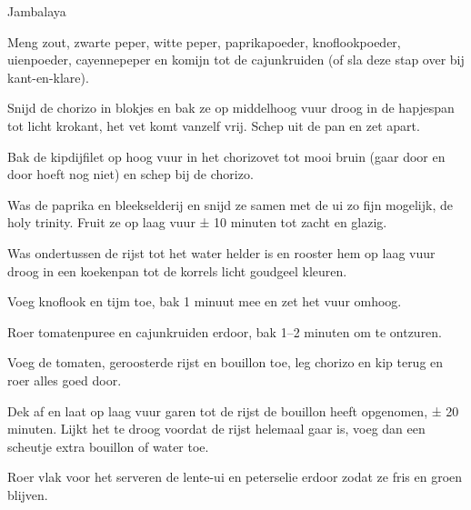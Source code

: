 \begin{recipe}{Jambalaya}
\begin{steps}
  \item Meng zout, zwarte peper, witte peper, paprikapoeder, knoflookpoeder,
        uienpoeder, cayennepeper en komijn tot de cajunkruiden (of sla deze
        stap over bij kant-en-klare).
  \item Snijd de chorizo in blokjes en bak ze op middelhoog vuur droog in de
        hapjespan tot licht krokant, het vet komt vanzelf vrij. Schep uit de
        pan en zet apart.
  \item Bak de kipdijfilet op hoog vuur in het chorizovet tot mooi bruin
        (gaar door en door hoeft nog niet) en schep bij de chorizo.
  \item Was de paprika en bleekselderij en snijd ze samen met de ui zo fijn
        mogelijk, de holy trinity. Fruit ze op laag vuur ± 10 minuten tot
        zacht en glazig.
  \item Was ondertussen de rijst tot het water helder is en rooster hem op
        laag vuur droog in een koekenpan tot de korrels licht goudgeel kleuren.
  \item Voeg knoflook en tijm toe, bak 1 minuut mee en zet het vuur omhoog.
  \item Roer tomatenpuree en cajunkruiden erdoor, bak 1–2 minuten om te ontzuren.
  \item Voeg de tomaten, geroosterde rijst en bouillon toe, leg chorizo en
        kip terug en roer alles goed door.
  \item Dek af en laat op laag vuur garen tot de rijst de bouillon heeft
        opgenomen, ± 20 minuten. Lijkt het te droog voordat de rijst helemaal
        gaar is, voeg dan een scheutje extra bouillon of water toe.
  \item Roer vlak voor het serveren de lente-ui en peterselie erdoor zodat ze
        fris en groen blijven.
\end{steps}

\end{recipe}
